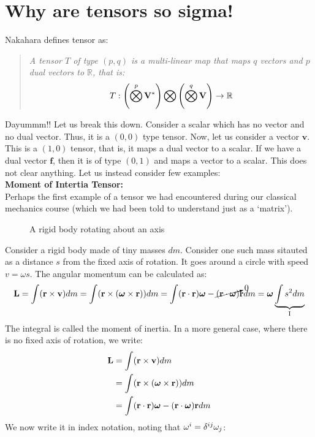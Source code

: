\section{Why are tensors so sigma!}
Nakahara defines tensor as:
\begin{quote}
    \textit{A tensor $T$ of type $(p,q)$ is a multi-linear map that maps $q$ vectors and $p$ dual vectors to $\mathbb{R}$, that is:
    $$ T: \left( \bigotimes\limits^p \mathbf{V}^*  \right)\bigotimes \left( \bigotimes\limits^q \mathbf{V}  \right)\to \mathbb{R} $$}
\end{quote}
Dayummm!!  Let us break this down. Consider a scalar which has no vector and no dual vector. Thus, it is a $(0,0)$ type tensor. Now, let us consider a vector $\mathbf{v}$. This is a $(1,0)$ tensor, that is, it maps a dual vector to a scalar. If we have a dual vector $\mathbf{f}$, then it is of type $(0,1)$ and maps a vector to a scalar. This does not clear anything. Let us instead consider few examples:\\[0.3cm]
\textbf{Moment of Intertia Tensor:}\\[0.3cm]
Perhaps the first example of a tensor we had encountered during our classical mechanics course (which we had been told to understand just as a `matrix'). 
\begin{figure}[H]
    \centering
    
    \caption{A rigid body rotating about an axis}
\end{figure}
\noindent
Consider a rigid body made of tiny masses $dm$. Consider one such mass sitauted as a distance $s$ from the fixed axis of rotation. It goes around a circle with speed $v = \omega s$. The angular momentum can be calculated as:
$$\mathbf{L} = \int (\boldsymbol{\mathbf{r}}\times \boldsymbol{\mathbf{v}})dm = \int (\boldsymbol{\mathbf{r}}\times (\boldsymbol{\mathbf{\omega}}\times \boldsymbol{\mathbf{r}}))dm = \int (\boldsymbol{\mathbf{r}}\cdot \boldsymbol{\mathbf{r}})\boldsymbol{\mathbf{\omega}} -  \cancelto{0}{(\boldsymbol{\mathbf{r}}\cdot \boldsymbol{\mathbf{\omega}})}\boldsymbol{\mathbf{r}}dm =\boldsymbol{\mathbf{\omega}} \underbrace{\int s^2 dm}_{\text{I}} $$
The integral is called the moment of inertia. In a more general case, where there is no fixed axis of rotation, we write: 
\begin{align*}
    \mathbf{L} &= \int (\boldsymbol{\mathbf{r}}\times \boldsymbol{\mathbf{v}})dm \\
    &= \int (\boldsymbol{\mathbf{r}}\times (\boldsymbol{\mathbf{\omega}}\times \boldsymbol{\mathbf{r}}))dm \\
    &= \int (\boldsymbol{\mathbf{r}}\cdot \boldsymbol{\mathbf{r}})\boldsymbol{\mathbf{\omega}} -  {(\boldsymbol{\mathbf{r}}\cdot \boldsymbol{\mathbf{\omega}})}\boldsymbol{\mathbf{r}}dm
\end{align*}
We now write it in index notation, noting that $\omega^i = \tensor*{\delta}{^i^j}\omega_j$:
